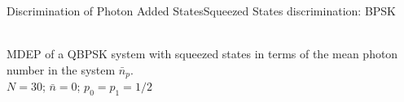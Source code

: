 \begin{frame}{Discrimination of Photon Added States}{Squeezed States discrimination: BPSK}
    \begin{center}
        \resizebox{0.7\textwidth}{!}{
            
        }\\
        \scriptsize{
        MDEP of a QBPSK system with squeezed states in terms of the mean photon number in the system $\bar{n}_p$.\\
        $N=30$; $\bar{n}=0$; $p_0=p_1=1/2$
        }
    \end{center}

\end{frame}